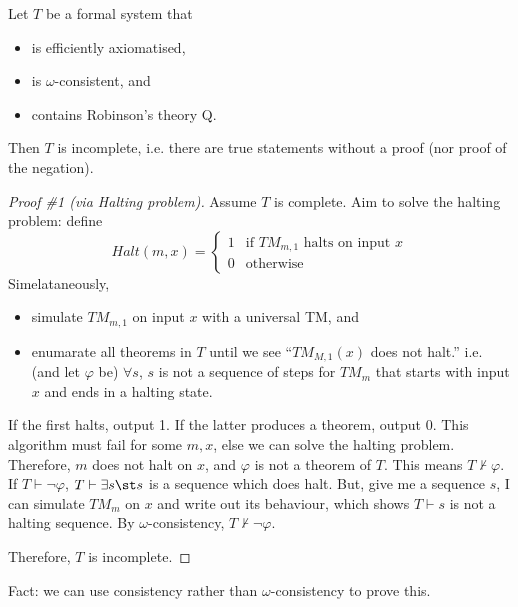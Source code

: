\documentclass{article}
\begin{document}
\begin{theorem}
    Let \(T\) be a formal system that
    \begin{itemize}
        \item is efficiently axiomatised,
        \item is \(\omega\)-consistent, and
        \item contains Robinson's theory Q.
    \end{itemize}
    
    Then \(T\) is incomplete,
    i.e. there are true statements without a proof (nor proof of the negation).
    
    \begin{proof}[Proof \#1 (via Halting problem)]
        Assume \(T\) is complete.
        Aim to solve the halting problem: define
        \[Halt(m,x)=\begin{cases}
            1 & \text{if \(TM_{m,1}\) halts on input } x \\
            0 & \text{otherwise}
        \end{cases}\]
        Simelataneously,
        \begin{itemize}
            \item simulate \(TM_{m,1}\) on input \(x\) with a universal TM, and
            \item enumarate all theorems in \(T\)
            until we see ``\(TM_{M,1}(x)\) does not halt.''
            i.e. (and let \(\varphi\) be) \(\forall s\), \(s\) is not a sequence of steps for
            \(TM_{m}\) that starts with input \(x\) and ends in a halting state.
        \end{itemize}
        If the first halts, output 1.
        If the latter produces a theorem, output 0.
        This algorithm must fail for some \(m,x\), else we can solve the halting problem.
        Therefore, \(m\) does not halt on \(x\), and \(\varphi\) is not a theorem of \(T\).
        This means \(T \nvdash \varphi\).
        If \(T\vdash \lnot \varphi\), \(T\vdash \exists s \st s\) is a sequence which does halt.
        But, give me a sequence \(s\), I can simulate \(TM_{m}\) on \(x\)
        and write out its behaviour, which shows \(T \vdash s\) is not a halting sequence.
        By \(\omega\)-consistency, \(T\nvdash \lnot \varphi\).
        
        Therefore, \(T\) is incomplete.
    \end{proof}
    
    Fact: we can use consistency rather than \(\omega\)-consistency to prove this.
    

\end{theorem}
\end{document}
